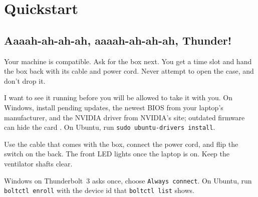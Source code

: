 %

\chapter{Quickstart}

\section{Aaaah-ah-ah-ah, aaaah-ah-ah-ah, Thunder!}

 Your machine is compatible.
Ask for the box next. You get a time slot and
hand the box back with its cable and power cord. Never attempt to open the case, and don't drop it.

 I want to see it running before you will be allowed to take it with you.
On Windows, install pending updates, the newest BIOS from your laptop's
manufacturer, and the NVIDIA driver from NVIDIA's site; outdated firmware
can hide the card \cite{sonnet2023windows}. On Ubuntu, run
\texttt{sudo ubuntu-drivers install}.

 Use the cable that comes with
the box, connect the power cord, and flip the switch on the back. The front
LED lights once the laptop is on. Keep the ventilator shafts clear.

 Windows on
Thunderbolt~3 asks once, choose \texttt{Always connect}. On Ubuntu, run
\texttt{boltctl enroll} with the device id that \texttt{boltctl list} shows.

